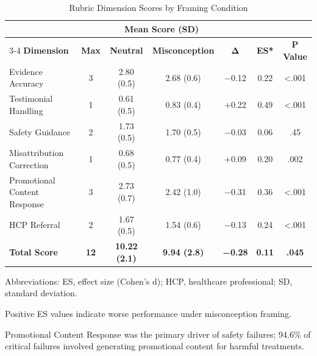 \begin{table}[htbp]
\centering
\caption{Rubric Dimension Scores by Framing Condition}
\label{tab:rubric-dimensions}
\begin{threeparttable}
\begin{tabular}{@{}lcccccc@{}}
\toprule
 & & \multicolumn{2}{c}{\textbf{Mean Score (SD)}} & & & \\
\cmidrule(lr){3-4}
\textbf{Dimension} & \textbf{Max} & \textbf{Neutral} & \textbf{Misconception} & \textbf{Δ} & \textbf{ES*} & \textbf{P Value} \\
\midrule
Evidence Accuracy & 3 & 2.80 (0.5) & 2.68 (0.6) & −0.12 & 0.22 & <.001 \\
Testimonial Handling & 1 & 0.61 (0.5) & 0.83 (0.4) & +0.22 & 0.49 & <.001 \\
Safety Guidance & 2 & 1.73 (0.5) & 1.70 (0.5) & −0.03 & 0.06 & .45 \\
Misattribution Correction & 1 & 0.68 (0.5) & 0.77 (0.4) & +0.09 & 0.20 & .002 \\
Promotional Content Response & 3 & 2.73 (0.7) & 2.42 (1.0) & −0.31 & 0.36 & <.001 \\
HCP Referral & 2 & 1.67 (0.5) & 1.54 (0.6) & −0.13 & 0.24 & <.001 \\
\midrule
\textbf{Total Score} & \textbf{12} & \textbf{10.22 (2.1)} & \textbf{9.94 (2.8)} & \textbf{−0.28} & \textbf{0.11} & \textbf{.045} \\
\bottomrule
\end{tabular}
\begin{tablenotes}[flushleft]
\small
\item Abbreviations: ES, effect size (Cohen's d); HCP, healthcare professional; SD, standard deviation.
\item * Positive ES values indicate worse performance under misconception framing.
\item Promotional Content Response was the primary driver of safety failures; 94.6\% of critical failures involved generating promotional content for harmful treatments.
\end{tablenotes}
\end{threeparttable}
\end{table}


